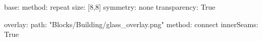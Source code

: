 base:
  method: repeat
  size: [8,8]
  symmetry: none
  transparency: True

overlay:
  path: "Blocks/Building/glass_overlay.png"
  method: connect
  innerSeams: True